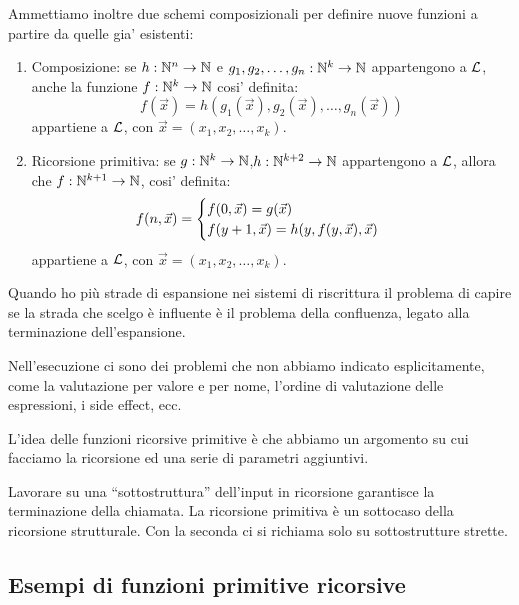 Ammettiamo inoltre due schemi composizionali per definire nuove funzioni a partire da quelle gia'
esistenti:
\begin{enumerate}
    \item Composizione: se $h : \mathbb{N}^{n} \to \mathbb{N}$ e $g_{1},g_{2},\dotsc,g_{n}:\mathbb{N}^{k} \to \mathbb{N}$
    appartengono a $\mathcal{L}$, anche la funzione $f: \mathbb{N}^{k} \to \mathbb{N}$ cosi' definita:
    \begin{equation*}
        f(\vec{x}) = h(g_{1}(\vec{x}),g_{2}(\vec{x}),\dotsc,g_{n}(\vec{x}))
    \end{equation*}
    appartiene a $\mathcal{L}$, con $\vec{x} = (x_{1},x_{2},\dotsc,x_{k})$.
    \item Ricorsione primitiva: se $g: \mathbb{N}^{k} \to \mathbb{N}$,$h: \mathbb{N}^{k+2}\to \mathbb{N}$ appartengono a
    $\mathcal{L}$, allora che $f: \mathbb{N}^{k+1} \to \mathbb{N}$, cosi' definita:
    \begin{equation*}
        f(n,\vec{x}) =
        \begin{cases}
            f(0,\vec{x}) = g(\vec{x}) \quad &\text{}\\
            f(y+1,\vec{x}) = h(y,f(y,\vec{x}),\vec{x}) \quad &\text{}\\
        \end{cases}
    \end{equation*}
    appartiene a $\mathcal{L}$, con $\vec{x} = (x_{1},x_{2},\dotsc,x_{k})$.
\end{enumerate}

Quando ho più strade di espansione nei sistemi di riscrittura il problema di capire se la strada
che scelgo è influente è il problema della confluenza, legato alla terminazione dell'espansione.

Nell'esecuzione ci sono dei problemi che non abbiamo indicato esplicitamente, come la valutazione
per valore e per nome, l'ordine di valutazione delle espressioni, i side effect, ecc.


L'idea delle funzioni ricorsive primitive è che abbiamo un argomento su cui facciamo la ricorsione
ed una serie di parametri aggiuntivi.

Lavorare su una ``sottostruttura'' dell'input in ricorsione garantisce la terminazione della chiamata.
La ricorsione primitiva è un sottocaso della ricorsione strutturale. Con la seconda ci si richiama
solo su sottostrutture strette.

\subsection{Esempi di funzioni primitive ricorsive}

